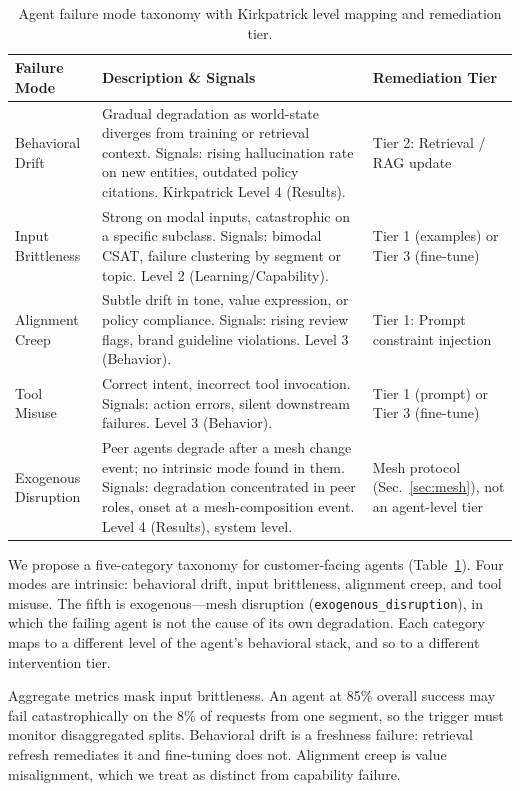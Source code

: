 \documentclass[conference]{IEEEtran}
\newcommand{\code}[1]{\texttt{\small #1}}
\begin{document}
\begin{table}[t]
\caption{Agent failure mode taxonomy with Kirkpatrick level mapping and
remediation tier.}
\label{tab:taxonomy}
\centering
\scriptsize
\begin{tabular}{@{}p{1.4cm}p{4.1cm}p{1.7cm}@{}}
\toprule
\textbf{Failure Mode} & \textbf{Description \& Signals} & \textbf{Remediation
Tier} \\
\midrule
Behavioral Drift &
Gradual degradation as world-state diverges from training or retrieval context.
Signals: rising hallucination rate on new entities, outdated policy citations.
Kirkpatrick Level 4 (Results). &
Tier 2: Retrieval / RAG update \\
\addlinespace
Input Brittleness &
Strong on modal inputs, catastrophic on a specific subclass. Signals: bimodal
CSAT, failure clustering by segment or topic. Level 2 (Learning/Capability). &
Tier 1 (examples) or Tier 3 (fine-tune) \\
\addlinespace
Alignment Creep &
Subtle drift in tone, value expression, or policy compliance. Signals: rising
review flags, brand guideline violations. Level 3 (Behavior). &
Tier 1: Prompt constraint injection \\
\addlinespace
Tool Misuse &
Correct intent, incorrect tool invocation. Signals: action errors, silent
downstream failures. Level 3 (Behavior). &
Tier 1 (prompt) or Tier 3 (fine-tune) \\
\addlinespace
Exogenous Disruption &
Peer agents degrade after a mesh change event; no intrinsic mode found in them.
Signals: degradation concentrated in peer roles, onset at a mesh-composition
event. Level 4 (Results), system level. &
Mesh protocol (Sec.~\ref{sec:mesh}), not an agent-level tier \\
\bottomrule
\end{tabular}
\end{table}

We propose a five-category taxonomy for customer-facing agents
(Table~\ref{tab:taxonomy}). Four modes are intrinsic: behavioral drift, input
brittleness, alignment creep, and tool misuse. The fifth is exogenous---mesh
disruption (\code{exogenous\_disruption}), in which the failing agent is not
the cause of its own degradation. Each category maps to a different level
of the agent's behavioral stack, and so to a different intervention tier.

Aggregate metrics mask input brittleness. An agent at 85\% overall success may
fail catastrophically on the 8\% of requests from one segment, so the trigger
must monitor disaggregated splits. Behavioral drift is a freshness failure:
retrieval refresh remediates it and fine-tuning does not. Alignment creep is
value misalignment, which we treat as distinct from capability failure.
\end{document}
